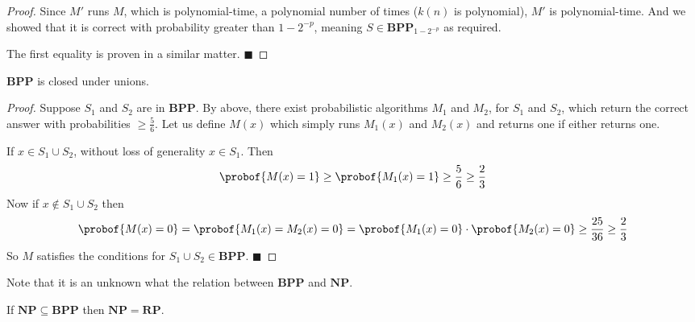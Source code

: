 \documentclass[10pt]{article}
\def\NP{\mathbf{NP}}
\def\RP{\mathbf{RP}}
\def\BPP{\mathbf{BPP}}
\def\qed{%
    \ifmmode%
        \eqno\blacksquare%
    \else%
        \hskip1cm\allowbreak\hbox{}\nobreak\hfill$\blacksquare$%
    \fi%
}
\begin{document}
\begin{proof}
    Since $M'$ runs $M$, which is polynomial-time, a polynomial number of times ($k(n)$ is polynomial), $M'$ is polynomial-time.
    And we showed that it is correct with probability greater than $1-2^{-p}$, meaning $S\in\BPP_{1-2^{-p}}$ as required.

    The first equality is proven in a similar matter.
    \qed

\end{proof}

\begin{prop*}

    $\BPP$ is closed under unions.

\end{prop*}

\begin{proof}

    Suppose $S_1$ and $S_2$ are in $\BPP$.
    By above, there exist probabilistic algorithms $M_1$ and $M_2$, for $S_1$ and $S_2$, which return the correct answer with probabilities $\geq\frac56$.
    Let us define $M(x)$ which simply runs $M_1(x)$ and $M_2(x)$ and returns one if either returns one.

    If $x\in S_1\cup S_2$, without loss of generality $x\in S_1$.
    Then
    \[ \probof{M(x)=1} \geq \probof{M_1(x)=1} \geq \frac56 \geq \frac23 \]
    Now if $x\notin S_1\cup S_2$ then
    \[ \probof{M(x)=0} = \probof{M_1(x)=M_2(x)=0} = \probof{M_1(x)=0}\cdot\probof{M_2(x)=0} \geq \frac{25}{36} \geq \frac23 \]
    So $M$ satisfies the conditions for $S_1\cup S_2\in\BPP$.
    \qed

\end{proof}

Note that it is an unknown what the relation between $\BPP$ and $\NP$.

\begin{prop*}

    If $\NP\subseteq\BPP$ then $\NP=\RP$.

\end{prop*}
\end{document}
